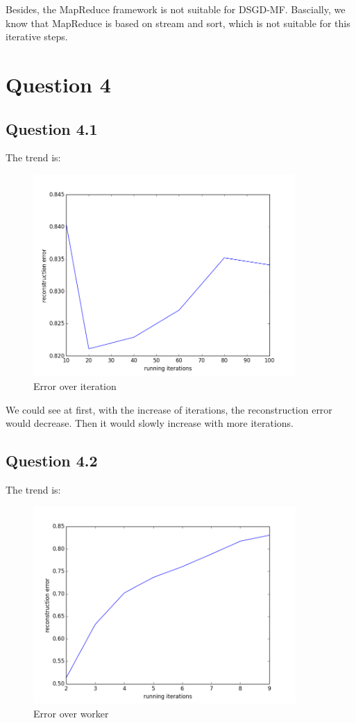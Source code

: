 \documentclass{article} %
\begin{document}
Besides, the MapReduce framework is not suitable for DSGD-MF. Bascially, we know
that MapReduce is based on stream and sort, which is not suitable for this
iterative steps.



\section{Question 4}


\subsection{Question 4.1}
The trend is:
\begin{figure}[h]
\begin{center}
\includegraphics[width=10cm]{pic/q41.png}
\end{center}
\caption{Error over iteration}
\end{figure}

We could see at first, with the increase of iterations, the reconstruction error
would decrease. Then it would slowly increase with more iterations.


\subsection{Question 4.2}
The trend is:
\begin{figure}[h]
\begin{center}
\includegraphics[width=10cm]{pic/q42.png}
\end{center}
\caption{Error over worker}
\end{figure}
\end{document}
